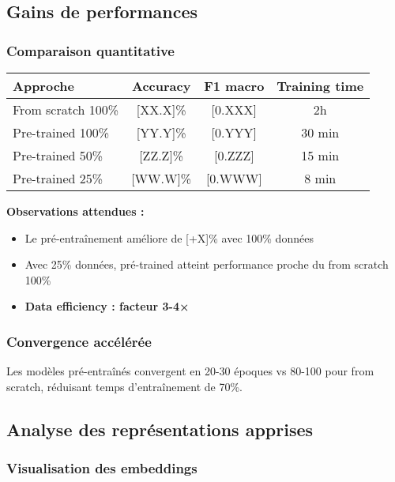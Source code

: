 \subsection{Gains de performances}

\subsubsection{Comparaison quantitative}

\begin{center}
\begin{tabular}{|l|c|c|c|}
\hline
\textbf{Approche} & \textbf{Accuracy} & \textbf{F1 macro} & \textbf{Training time} \\
\hline
From scratch 100\% & [XX.X]\% & [0.XXX] & 2h \\
Pre-trained 100\% & [YY.Y]\% & [0.YYY] & 30 min \\
Pre-trained 50\% & [ZZ.Z]\% & [0.ZZZ] & 15 min \\
Pre-trained 25\% & [WW.W]\% & [0.WWW] & 8 min \\
\hline
\end{tabular}
\end{center}

\textbf{Observations attendues :}
\begin{itemize}
    \item Le pré-entraînement améliore de [+X]\% avec 100\% données
    \item Avec 25\% données, pré-trained atteint performance proche du from scratch 100\%
    \item \textbf{Data efficiency : facteur 3-4×}
\end{itemize}

\subsubsection{Convergence accélérée}

Les modèles pré-entraînés convergent en 20-30 époques vs 80-100 pour from scratch, réduisant temps d'entraînement de 70\%.

\subsection{Analyse des représentations apprises}

\subsubsection{Visualisation des embeddings}


